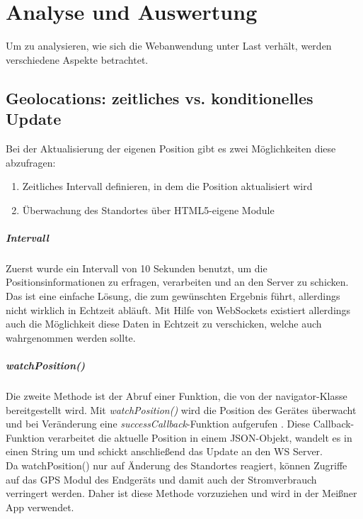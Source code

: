 \chapter{Analyse und Auswertung}
Um zu analysieren, wie sich die Webanwendung unter Last verhält, werden verschiedene Aspekte betrachtet.

\section{Geolocations: zeitliches vs. konditionelles Update}
Bei der Aktualisierung der eigenen Position gibt es zwei Möglichkeiten diese abzufragen:

\begin{enumerate}
	\item Zeitliches Intervall definieren, in dem die Position aktualisiert wird
	\item Überwachung des Standortes über HTML5-eigene Module
\end{enumerate}

\paragraph{Intervall}
Zuerst wurde ein Intervall von 10 Sekunden benutzt, um die Positionsinformationen zu erfragen, verarbeiten und an den Server zu schicken. Das ist eine einfache Lösung, die zum gewünschten Ergebnis führt, allerdings nicht wirklich in Echtzeit abläuft. Mit Hilfe von WebSockets existiert allerdings auch die Möglichkeit diese Daten in Echtzeit zu verschicken, welche auch wahrgenommen werden sollte.

\paragraph{watchPosition()}
Die zweite Methode ist der Abruf einer Funktion, die von der navigator-Klasse bereitgestellt wird. Mit \emph{watchPosition()} wird die Position des Gerätes überwacht und bei Veränderung eine \emph{successCallback}-Funktion aufgerufen \cite{geolocationapi}. Diese Callback-Funktion verarbeitet die aktuelle Position in einem JSON-Objekt, wandelt es in einen String um und schickt anschließend das Update an den WS Server.\\
Da watchPosition() nur auf Änderung des Standortes reagiert, können Zugriffe auf das GPS Modul des Endgeräts und damit auch der Stromverbrauch verringert werden. Daher ist diese Methode vorzuziehen und wird in der Meißner App verwendet.

